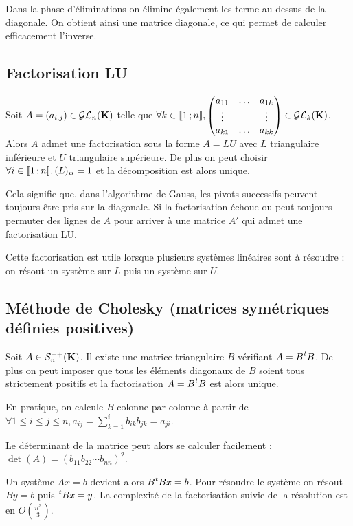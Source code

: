 	Dans la phase d'éliminations on élimine également les terme au-dessus de la diagonale.
	On obtient ainsi une matrice diagonale, ce qui permet de calculer efficacement l'inverse.

\subsection{Factorisation LU}

	\begin{thm}
		Soit $A = (a_{i,j}) \in \mathcal{GL}_n(\mathbf{K})$ telle que $\forall k \in \mathopen{[\![}1\mathclose{}\mathpunct{};n\mathclose{]\!]},
			\begin{pmatrix}
				a_{11} & \ldots & a_{1k} \\
				\vdots &        & \vdots \\
				a_{k1} & \ldots & a_{kk} \end{pmatrix}
			\in \mathcal{GL}_k(\mathbf{K})$.
		Alors $A$ admet une factorisation sous la forme $A = LU$ avec $L$ triangulaire inférieure et $U$ triangulaire supérieure.
		De plus on peut choisir $\forall i \in \mathopen{[\![}1\mathclose{}\mathpunct{};n\mathclose{]\!]}, (L)_{ii} = 1$ et la décomposition est alors unique.
	\end{thm}
	
	Cela signifie que, dans l'algorithme de Gauss, les pivots successifs peuvent toujours être pris sur la diagonale.
	Si la factorisation échoue ou peut toujours permuter des lignes de $A$ pour arriver à une matrice $A'$ qui admet une factorisation LU.
	
	Cette factorisation est utile lorsque plusieurs systèmes linéaires sont à résoudre : on résout un système sur $L$ puis un système sur $U$.

\subsection{Méthode de Cholesky (matrices symétriques définies positives)}

	\begin{thm}
		Soit $A \in \mathcal{S}^{++}_n(\mathbf{K})$.
		Il existe une matrice triangulaire $B$ vérifiant $A = B \transp{B}$.
		De plus on peut imposer que tous les éléments diagonaux de $B$ soient tous strictement positifs et la factorisation $A = B \transp{B}$ est alors unique.
	\end{thm}
	
	En pratique, on calcule $B$ colonne par colonne à partir de $\forall 1 \leq i \leq j \leq n, a_{ij} = \sum_{k = 1}^i b_{ik} b_{jk} = a_{ji}$.
	
	\begin{rem}
		Le déterminant de la matrice peut alors se calculer facilement : $\det(A) = (b_{11} b_{22} \cdots b_{nn})^2$.
	\end{rem}
	
	Un système $Ax = b$ devient alors $B \transp{B} x = b$.
	Pour résoudre le système on résout $By = b$ puis $\transp{B}x = y$.
	La complexité de la factorisation suivie de la résolution est en $O \left( \frac{n^3}{3} \right)$.